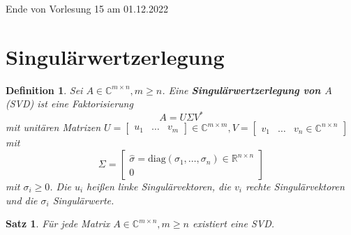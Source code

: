 \documentclass{book}
\newtheorem{theorem}[algorithm]{Satz}
\newtheorem{definition}[algorithm]{Definition}
\def\C{\mathbb{C}}
\def\R{\mathbb{R}}
\begin{document}
            \noindent
            \xrfill[0.7ex]{1pt}Ende von Vorlesung 15 am 01.12.2022\xrfill[0.7ex]{1pt}
            
        \section{Singulärwertzerlegung}

            \begin{definition}\label{d4.20}
                Sei $A\in\C^{m\times n},m\geq n$. Eine \textbf{Singulärwertzerlegung von $A$} (SVD) ist eine Faktorisierung
                \[A=U\Sigma V^*\]
                mit unitären Matrizen $U=\begin{bmatrix}
                    u_1&\dots &v_m
                \end{bmatrix}\in\C^{m\times m},V=\begin{bmatrix}
                    v_1 & \dots & v_n\in\C^{n\times n}
                \end{bmatrix}$
                mit \[\Sigma = \begin{bmatrix}
                    \hat{\sigma}=\text{diag}(\sigma_1,\dots,\sigma_n)\in\R^{n\times n}\\
                    0
                \end{bmatrix}\]
                mit $\sigma_i\geq 0$. Die $u_i$ heißen linke Singulärvektoren, die $v_i$ rechte Singulärvektoren und die $\sigma_i$ Singulärwerte.
            \end{definition}

            \begin{theorem}\label{s4.21}
                Für jede Matrix $A\in\C^{m\times n},m\geq n$ existiert eine SVD.
            \end{theorem}
\end{document}
